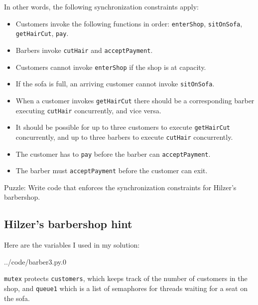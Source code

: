 \documentclass{book}
\begin{document}
In other words, the following synchronization constraints apply:

\begin{itemize}

    \item Customers invoke the following functions in order:
          {\tt enterShop}, {\tt sitOnSofa},
          {\tt getHairCut}, {\tt pay}.

    \item Barbers invoke {\tt cutHair} and {\tt acceptPayment}.

    \item Customers cannot invoke {\tt enterShop} if the shop
          is at capacity.

    \item If the sofa is full, an arriving customer cannot invoke
              {\tt sitOnSofa}.

    \item When a customer invokes {\tt getHairCut} there should be
          a corresponding barber executing {\tt cutHair} concurrently,
          and vice versa.

    \item It should be possible for up to three customers to execute
              {\tt getHairCut} concurrently, and up to three barbers to execute
              {\tt cutHair} concurrently.

    \item The customer has to {\tt pay} before the barber can
              {\tt acceptPayment}.

    \item The barber must {\tt acceptPayment} before the customer can
          exit.

\end{itemize}

Puzzle: Write code that enforces the synchronization
constraints for Hilzer's barbershop.


\subsection {Hilzer's barbershop hint}

Here are the variables I used in my solution:

\newpage

{../code/barber3.py.0}

{\tt mutex} protects {\tt customers}, which keeps track of the
number of customers in the shop, and {\tt queue1} which is a list
of semaphores for threads waiting for a seat on the sofa.
\end{document}
